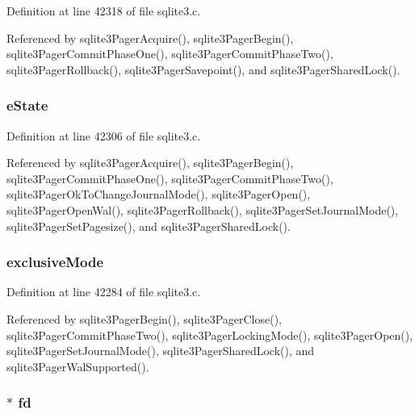 Definition at line 42318 of file sqlite3.\+c.



Referenced by sqlite3\+Pager\+Acquire(), sqlite3\+Pager\+Begin(), sqlite3\+Pager\+Commit\+Phase\+One(), sqlite3\+Pager\+Commit\+Phase\+Two(), sqlite3\+Pager\+Rollback(), sqlite3\+Pager\+Savepoint(), and sqlite3\+Pager\+Shared\+Lock().

\hypertarget{struct_pager_ae5babd54e329060ed9f926ca6df3ab4d}{}
\subsubsection[{e\+State}]{ e\+State}\label{struct_pager_ae5babd54e329060ed9f926ca6df3ab4d}


Definition at line 42306 of file sqlite3.\+c.



Referenced by sqlite3\+Pager\+Acquire(), sqlite3\+Pager\+Begin(), sqlite3\+Pager\+Commit\+Phase\+One(), sqlite3\+Pager\+Commit\+Phase\+Two(), sqlite3\+Pager\+Ok\+To\+Change\+Journal\+Mode(), sqlite3\+Pager\+Open(), sqlite3\+Pager\+Open\+Wal(), sqlite3\+Pager\+Rollback(), sqlite3\+Pager\+Set\+Journal\+Mode(), sqlite3\+Pager\+Set\+Pagesize(), and sqlite3\+Pager\+Shared\+Lock().

\hypertarget{struct_pager_a97470c2be335613df4fd3af652fa60dc}{}
\subsubsection[{exclusive\+Mode}]{ exclusive\+Mode}\label{struct_pager_a97470c2be335613df4fd3af652fa60dc}


Definition at line 42284 of file sqlite3.\+c.



Referenced by sqlite3\+Pager\+Begin(), sqlite3\+Pager\+Close(), sqlite3\+Pager\+Commit\+Phase\+Two(), sqlite3\+Pager\+Locking\+Mode(), sqlite3\+Pager\+Open(), sqlite3\+Pager\+Set\+Journal\+Mode(), sqlite3\+Pager\+Shared\+Lock(), and sqlite3\+Pager\+Wal\+Supported().

\hypertarget{struct_pager_a4181565f26eda2c718763effefea106b}{}
\subsubsection[{fd}]{$\ast$ fd}\label{struct_pager_a4181565f26eda2c718763effefea106b}


